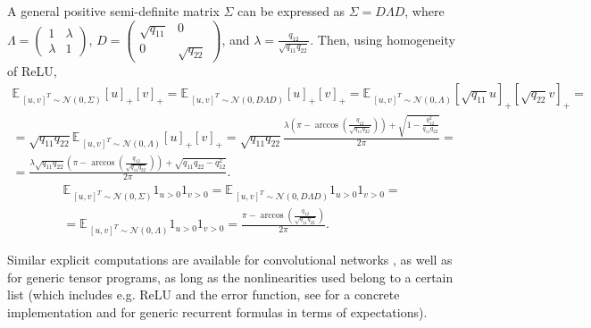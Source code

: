\documentclass{article}
\newcommand{\EE}{\mathbb{E}\,}
\newcommand{\NN}{\mathcal{N}}
\begin{document}
    A general positive semi-definite matrix $\Sigma$ can be expressed as $\Sigma = D \Lambda D$, where $\Lambda = \begin{pmatrix} 1 & \lambda\\\lambda & 1 \end{pmatrix}$, $D = \begin{pmatrix} \sqrt{q_{11}} & 0\\0 & \sqrt{q_{22}} \end{pmatrix}$, and $\lambda = \frac{q_{12}}{\sqrt{q_{11} q_{22}}}$.
    Then, using homogeneity of ReLU,
    \begin{multline}
        \EE_{[u,v]^T \sim \NN(0,\Sigma)} [u]_+ [v]_+
        = \EE_{[u,v]^T \sim \NN(0,D \Lambda D)} [u]_+ [v]_+
        = \EE_{[u,v]^T \sim \NN(0,\Lambda)} [\sqrt{q_{11}} u]_+ [\sqrt{q_{22}} v]_+
        =\\= \sqrt{q_{11} q_{22}} \EE_{[u,v]^T \sim \NN(0,\Lambda)} [u]_+ [v]_+
        = \sqrt{q_{11} q_{22}} \frac{\lambda\left(\pi - \arccos\left(\frac{q_{12}}{\sqrt{q_{11} q_{22}}}\right)\right) + \sqrt{1-\frac{q_{12}^2}{q_{11} q_{22}}}}{2\pi}
        =\\= \frac{\lambda \sqrt{q_{11} q_{22}} \left(\pi - \arccos\left(\frac{q_{12}}{\sqrt{q_{11} q_{22}}}\right)\right) + \sqrt{q_{11} q_{22} - q_{12}^2}}{2\pi}.
    \end{multline}
    \begin{multline}
        \EE_{[u,v]^T \sim \NN(0,\Sigma)} 1_{u>0} 1_{v>0}
        = \EE_{[u,v]^T \sim \NN(0,D \Lambda D)} 1_{u>0} 1_{v>0}
        =\\= \EE_{[u,v]^T \sim \NN(0,\Lambda)} 1_{u>0} 1_{v>0}
        = \frac{\pi - \arccos\left(\frac{q_{12}}{\sqrt{q_{11} q_{22}}}\right)}{2\pi}.
    \end{multline}

    Similar explicit computations are available for convolutional networks \cite{arora2019exact}, as well as for generic tensor programs, as long as the nonlinearities used belong to a certain list (which includes e.g. ReLU and the error function, see \cite{novak2019neural} for a concrete implementation and \cite{yang2020tensor_ii} for generic recurrent formulas in terms of expectations).
    
\end{document}
